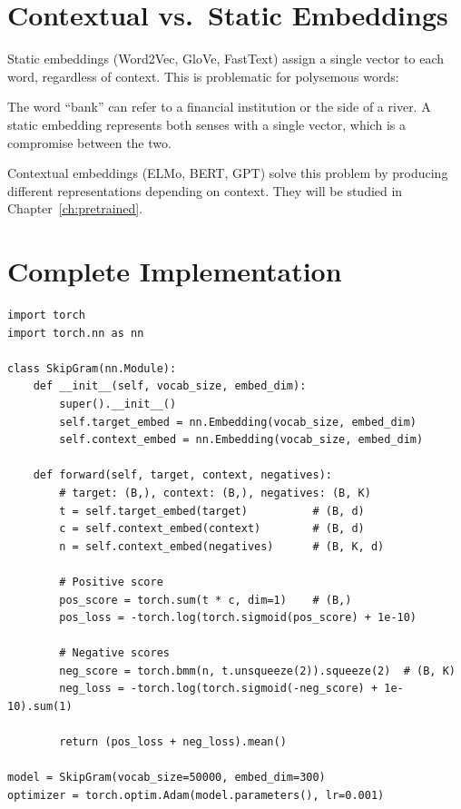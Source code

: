 \section{Contextual vs.\ Static Embeddings}
\label{sec:emb:contextual}

Static embeddings (Word2Vec, GloVe, FastText) assign a single vector to each
word, regardless of context. This is problematic for polysemous words:

\begin{example}
The word ``bank'' can refer to a financial institution or the side of a river.
A static embedding represents both senses with a single vector, which is a
compromise between the two.
\end{example}

Contextual embeddings (ELMo, BERT, GPT) solve this problem by producing
different representations depending on context. They will be studied in
Chapter~\ref{ch:pretrained}.

\section{Complete Implementation}
\label{sec:emb:implementation}

\begin{codeblock}[title=\textbf{Skip-gram training with PyTorch}]
\begin{verbatim}
import torch
import torch.nn as nn

class SkipGram(nn.Module):
    def __init__(self, vocab_size, embed_dim):
        super().__init__()
        self.target_embed = nn.Embedding(vocab_size, embed_dim)
        self.context_embed = nn.Embedding(vocab_size, embed_dim)

    def forward(self, target, context, negatives):
        # target: (B,), context: (B,), negatives: (B, K)
        t = self.target_embed(target)          # (B, d)
        c = self.context_embed(context)        # (B, d)
        n = self.context_embed(negatives)      # (B, K, d)

        # Positive score
        pos_score = torch.sum(t * c, dim=1)    # (B,)
        pos_loss = -torch.log(torch.sigmoid(pos_score) + 1e-10)

        # Negative scores
        neg_score = torch.bmm(n, t.unsqueeze(2)).squeeze(2)  # (B, K)
        neg_loss = -torch.log(torch.sigmoid(-neg_score) + 1e-10).sum(1)

        return (pos_loss + neg_loss).mean()

model = SkipGram(vocab_size=50000, embed_dim=300)
optimizer = torch.optim.Adam(model.parameters(), lr=0.001)
\end{verbatim}
\end{codeblock}

